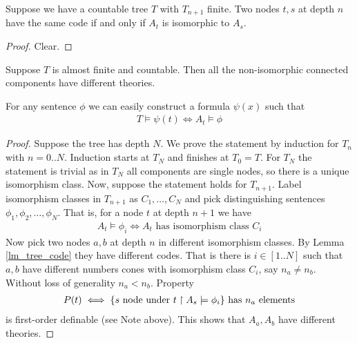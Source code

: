 \documentclass{amsart}
\begin{document}
\begin{Lemma} \label{lm_tree_code}
	Suppose we have a countable tree $T$ with $T_{n+1}$ finite. Two nodes $t,s$ at depth $n$ have the same code if and only if $A_t$ is isomorphic to $A_s$.
\end{Lemma}

\begin{proof}
	Clear.
\end{proof}

\begin{Lemma} \label{lm_categoricity}
	Suppose $T$ is almost finite and countable. Then all the non-isomorphic connected components have different theories.
\end{Lemma}

\begin{Note}
	For any sentence $\phi$ we can easily construct a formula $\psi(x)$ such that
	\begin{align*}
		T \models \psi(t) \iff A_t \models \phi
	\end{align*}
\end{Note}

\begin{proof}
	Suppose the tree has depth $N$. We prove the statement by induction for $T_n$ with $n = 0..N$. Induction starts at $T_N$ and finishes at $T_0 = T$. For $T_N$ the statement is trivial as in $T_N$ all components are single nodes, so there is a unique isomorphism class. Now, suppose the statement holds for $T_{n+1}$. Label isomorphism classes in $T_{n+1}$ as $C_1, \ldots, C_N$ and pick distinguishing sentences $\phi_1, \phi_2, \ldots, \phi_N$. That is, for a node $t$ at depth $n+1$ we have 
	\begin{align*}
		A_t \models \phi_i \iff A_t \text{ has isomorphism class } C_i
	\end{align*}
	Now pick two nodes $a,b$ at depth $n$ in different isomorphism classes. By Lemma \ref{lm_tree_code} they have different codes. That is there is $i \in [1..N]$ such that $a,b$ have different numbers cones with isomorphism class $C_i$, say $n_a \neq n_b$. Without loss of generality $n_a < n_b$. Property
	\begin{align*}
		P(t) \iff \{s \text{ node under $t$} \upharpoonright A_s \models \phi_i\} \text { has $n_a$ elements}
	\end{align*}
	is first-order definable (see Note above). This shows that $A_a, A_b$ have different theories. 
\end{proof}
\end{document}
